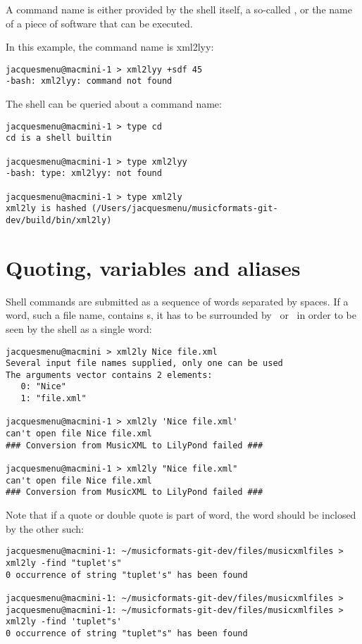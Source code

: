 A command name is either provided by the shell itself, a so-called , or the name of a piece of software that can be executed.

In this example, the command name is xml2lyy:
\begin{lstlisting}[language=Terminal]
jacquesmenu@macmini-1 > xml2lyy +sdf 45
-bash: xml2lyy: command not found
\end{lstlisting}

The shell can be queried about a command name:
\begin{lstlisting}[language=Terminal]
jacquesmenu@macmini-1 > type cd
cd is a shell builtin

jacquesmenu@macmini-1 > type xml2lyy
-bash: type: xml2lyy: not found

jacquesmenu@macmini-1 > type xml2ly
xml2ly is hashed (/Users/jacquesmenu/musicformats-git-dev/build/bin/xml2ly)
\end{lstlisting}


\section{Quoting, variables and aliases}\label{Quoting, variables and aliases}

Shell commands are submitted as a sequence of words separated by spaces. If a word, such a file name, contains s, it has to be surrounded by \quotes\ or \doubleQuotes\ in order to be seen by the shell as a single word:
\begin{lstlisting}[language=Terminal]
jacquesmenu@macmini > xml2ly Nice file.xml
Several input file names supplied, only one can be used
The arguments vector contains 2 elements:
   0: "Nice"
   1: "file.xml"

jacquesmenu@macmini-1 > xml2ly 'Nice file.xml'
can't open file Nice file.xml
### Conversion from MusicXML to LilyPond failed ###

jacquesmenu@macmini-1 > xml2ly "Nice file.xml"
can't open file Nice file.xml
### Conversion from MusicXML to LilyPond failed ###
\end{lstlisting}

Note that if a quote or double quote is part of word, the word should be inclosed by the other such:
\begin{lstlisting}[language=Terminal]
jacquesmenu@macmini-1: ~/musicformats-git-dev/files/musicxmlfiles > xml2ly -find "tuplet's"
0 occurrence of string "tuplet's" has been found

jacquesmenu@macmini-1: ~/musicformats-git-dev/files/musicxmlfiles > 
jacquesmenu@macmini-1: ~/musicformats-git-dev/files/musicxmlfiles > xml2ly -find 'tuplet"s'
0 occurrence of string "tuplet"s" has been found
\end{lstlisting}

